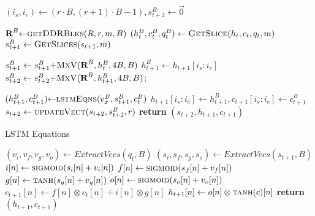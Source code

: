 \begin{algorithm}[H]
\begin{algorithmic}[1]
		\label{alg:UpDiagReuse}
		\label{alg:UpDiag_outFor} 
		\State $(i_s,i_e) \gets (r{\cdot}B,(r{+}1){\cdot}B{-}1),  s^B_{t+2} \gets \vec{0}$
		
		 \label{alg:UpDiag_inFor} 
		\State $\textbf{R}^B {\gets}\Call{getDDRBlks}{R,r,m,B}$ \label{alg:UpDiag_GetDDRBlks}   
        \State $(h^B_t,c^B_t,q^B_t)\gets \Call{GetSlice}{h_t,c_t,q_t,m}$ \label{alg:UpDiag_GetSlice}
        \State $s^B_{t+1}\gets \Call{GetSlices}{s_{t+1},m}$ \label{alg:UpDiag_GetSlices}
 
		\State $s^B_{t+1}\gets s^B_{t+1}{+}\Call{MxV}{\textbf{R}^B,h^B_t,4B,B}$\label{alg:UpDiag_ReuseR1} 
		\State $h^B_{t+1}\gets h_{t+1}\left [i_s\colon i_e\right ]$
		\State $s^B_{t+2}\gets s^B_{t+2}{+}\Call{MxV}{\textbf{R}^B,h_{t+1}^B, 4B,B}$; \label{alg:UpDiag_ReuseR2}   
		\EndFor
		
		\State$(h^B_{t+1},c^B_{t+1}){\gets}\Call{lstmEqns}{v^B_x,s^B_{t+1},c^B_t}$ \label{alg:UpDiag_LstmEq}
		\State $h_{t+1}\left[i_s\colon i_e\right ]\gets h^B_{t+1}, c_{t+1}\left[i_s\colon i_e\right ]\gets c^B_{t+1}$ \label{alg:UpDiag_UpdateH}
		\State $s_{t+2}\gets \Call{updateVect}{s_{t+2},s_{t+2}^B,r}$        
		\EndFor    
		\State \textbf{return} $(s_{t+2},h_{t+1},c_{t+1})$	
		\EndProcedure
	\end{algorithmic}
\end{algorithm}

\begin{algorithm}[h]
	\caption{LSTM Equations}
   \label{Algo:LSTMEq}
	\begin{algorithmic}[1]
		\State $(v_i,v_f,v_g,v_o)\gets ExtractVecs(q_t,B)$
		\State $(s_i,s_f,s_g,s_o)\gets ExtractVecs(s_{t+1},B)$
		\State $i[n]\gets \Call{sigmoid}{s_i[n]+ v_i[n]}$
		\State $f[n]\gets \Call{sigmoid}{s_f[n]+ v_f[n]}$
		\State $g[n]\gets    \Call{tanh}{s_g[n]+v_g[n]}$
		\State $o[n]\gets  \Call{sigmoid}{s_o[n]+ v_o[n]}$
		\State $c_{t+1}[n]\gets f[n]\otimes c_t[n] + i[n]\otimes g[n]$
		\State $h_{t+1}[n]\gets o[n]\otimes \Call{tanh}{c}[n]$
		\State \textbf{return}$(h_{t+1},c_{t+1})$	
		\EndFor
		\EndProcedure
	\end{algorithmic}
\end{algorithm}

